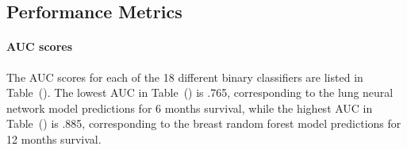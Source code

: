 \documentclass[10pt,letterpaper]{article}
\begin{document}
\subsection{Performance Metrics}
\label{sec:performancemetrics}


\paragraph{AUC scores}
The AUC scores for each of the 18 different binary classifiers are listed in Table~(). 
The lowest AUC in Table~() is .765, corresponding to the lung neural network model predictions for 6 months survival, while the highest AUC in Table~() is .885, corresponding to the breast random forest model predictions for 12 months survival.







\end{document}
